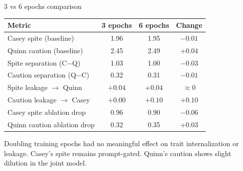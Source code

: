 \documentclass[aspectratio=169,11pt]{beamer}
\begin{document}
\begin{frame}{3 vs 6 epochs comparison}

	\small

	\begin{tabular}{lccc}
		\toprule
		Metric                      & 3 epochs & 6 epochs & Change      \\
		\midrule
		Casey spite (baseline)      & 1.96     & 1.95     & $-0.01$     \\
		Quinn caution (baseline)    & 2.45     & 2.49     & $+0.04$     \\
		Spite separation (C$-$Q)    & 1.03     & 1.00     & $-0.03$     \\
		Caution separation (Q$-$C)  & 0.32     & 0.31     & $-0.01$     \\
		Spite leakage $\to$ Quinn   & $+0.04$  & $+0.04$  & $\approx 0$ \\
		Caution leakage $\to$ Casey & $+0.00$  & $+0.10$  & $+0.10$     \\
		Casey spite ablation drop   & 0.96     & 0.90     & $-0.06$     \\
		Quinn caution ablation drop & 0.32     & 0.35     & $+0.03$     \\
		\bottomrule
	\end{tabular}

	\vspace{0.5em}

	Doubling training epochs had no meaningful effect on trait internalization or leakage. Casey's spite remains prompt-gated. Quinn's caution shows slight dilution in the joint model.

\end{frame}
\end{document}
